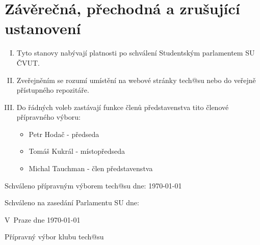 \documentclass[10pt]{article}
\begin{document}
\section{Závěrečná, přechodná a zrušující ustanovení}
	\begin{enumerate}[I.]
	\item Tyto stanovy nabývají platnosti po schválení Studentským parlamentem SU ČVUT.
	\item Zveřejněním se rozumí umístění na webové stránky tech@su nebo do veřejně přístupného repozitáře.
	\item Do řádných voleb zastávají funkce členů představenstva tito členové přípravného výboru:
		\begin{itemize}
			\item Petr Hodač - předseda
			\item Tomáš Kukrál - místopředseda
			\item Michal Tauchman - člen představenstva
		\end{itemize}
	\end{enumerate}


\vspace{10mm}

Schváleno přípravným výborem tech@su dne: \today

Schváleno na zasedání Parlamentu SU dne:

\vspace{30mm}

\hfill V~Praze dne \today

\hfill Přípravný výbor klubu tech@su
\end{document}
